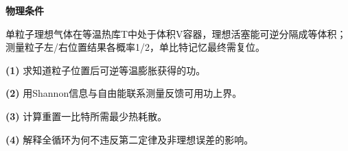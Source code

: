 \textbf{物理条件}\par 单粒子理想气体在等温热库T中处于体积V容器，理想活塞能可逆分隔成等体积；测量粒子左/右位置结果各概率1/2，单比特记忆最终需复位。
\par\noindent\textbf{(1)} 求知道粒子位置后可逆等温膨胀获得的功。
\par\noindent\textbf{(2)} 用Shannon信息与自由能联系测量反馈可用功上界。
\par\noindent\textbf{(3)} 计算重置一比特所需最少热耗散。
\par\noindent\textbf{(4)} 解释全循环为何不违反第二定律及非理想误差的影响。

